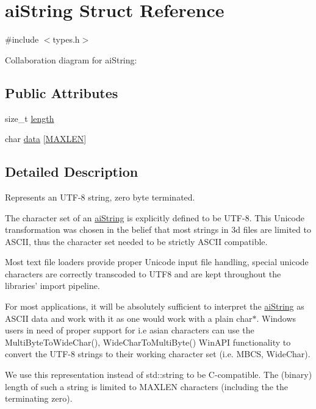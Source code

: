 \hypertarget{structai_string}{\section{ai\-String Struct Reference}
\label{structai_string}
}


{\ttfamily \#include $<$types.\-h$>$}



Collaboration diagram for ai\-String\-:
\subsection*{Public Attributes}
\begin{DoxyCompactItemize}
\item 
size\-\_\-t \hyperlink{structai_string_a7d77c2031ff0340746aa046f7fbcf313}{length}
\item 
char \hyperlink{structai_string_aa90b1da7d347a3dcca0a95061e6ea41d}{data} \mbox{[}\hyperlink{types_8h_ae6648cd71a8bd49d58ae8ed33ba910d1}{M\-A\-X\-L\-E\-N}\mbox{]}
\end{DoxyCompactItemize}


\subsection{Detailed Description}
Represents an U\-T\-F-\/8 string, zero byte terminated.

The character set of an \hyperlink{structai_string}{ai\-String} is explicitly defined to be U\-T\-F-\/8. This Unicode transformation was chosen in the belief that most strings in 3d files are limited to A\-S\-C\-I\-I, thus the character set needed to be strictly A\-S\-C\-I\-I compatible.

Most text file loaders provide proper Unicode input file handling, special unicode characters are correctly transcoded to U\-T\-F8 and are kept throughout the libraries' import pipeline.

For most applications, it will be absolutely sufficient to interpret the \hyperlink{structai_string}{ai\-String} as A\-S\-C\-I\-I data and work with it as one would work with a plain char$\ast$. Windows users in need of proper support for i.\-e asian characters can use the Multi\-Byte\-To\-Wide\-Char(), Wide\-Char\-To\-Multi\-Byte() Win\-A\-P\-I functionality to convert the U\-T\-F-\/8 strings to their working character set (i.\-e. M\-B\-C\-S, Wide\-Char).

We use this representation instead of std\-::string to be C-\/compatible. The (binary) length of such a string is limited to M\-A\-X\-L\-E\-N characters (including the the terminating zero). 


